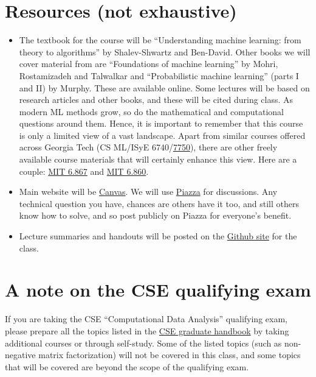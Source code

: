 \documentclass[12pt]{article}
\begin{document}
\section{Resources (not exhaustive)}
\label{sec:resources}
\begin{itemize}
	\item The textbook for the course will be ``Understanding machine learning: from theory to algorithms'' by Shalev-Shwartz and Ben-David. Other books we will cover material from are ``Foundations of machine learning'' by Mohri, Rostamizadeh and Talwalkar and ``Probabilistic machine learning'' (parts I and II) by Murphy. These are available online. Some lectures will be based on research articles and other books, and these will be cited during class. 
As modern ML methods grow, so do the mathematical and computational questions around them. Hence, it is important to remember that this course is only a limited view of a vast landscape. Apart from similar courses offered across Georgia Tech (CS ML/ISyE 6740/\href{https://sites.gatech.edu/ashwin-pananjady/7750-mathematical-foundations-of-machine-learning-fall-22/}{7750}), there are other freely available course materials that will certainly enhance this view. Here are a couple: \href{https://ocw.mit.edu/courses/6-867-machine-learning-fall-2006/}{MIT 6.867} and \href{http://www.mit.edu/~9.520/fall19/}{MIT 6.860}.

	\item Main website will be \href{https://canvas.gatech.edu}{Canvas}. We will use \href{https://piazza.com/gatech/fall2023/cse6740a/info}{Piazza} for discussions. Any technical question you have, chances are others have it too, and still others know how to solve, and so post publicly on Piazza for everyone's benefit. 
	\item Lecture summaries and handouts will be posted on the \href{https://github.com/ni-sha-c/CSE-6740-Fall23}{Github site} for the class.

\end{itemize}
\section{A note on the CSE qualifying exam}
If you are taking the CSE ``Computational Data Analysis'' qualifying exam, please prepare all the topics listed in the \href{https://cse.gatech.edu/sites/default/files/documents/2023/Handbook-2023-06-07.pdf}{CSE graduate handbook} by taking additional courses or through self-study. Some of the listed topics (such as non-negative matrix factorization) will not be covered in this class, and some topics that will be covered are beyond the scope of the qualifying exam.
\
\end{document}
